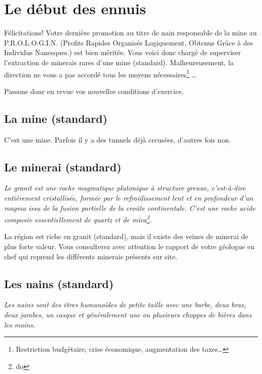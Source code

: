 
\newpage

\section{Le début des ennuis}

  Félicitations! Votre dernière promotion au titre de nain responsable de la
  mine au P.R.O.L.O.G.I.N. (Profits Rapides Organisés Logiquement, Obtenus Grâce à des Individus Nanesques.) est bien méritée. Vous voici donc chargé de superviser
  l'extraction de minerais rares d'une mine (standard). Malheureusement, la
  direction ne vous a pas accordé tous les moyens nécessaires\footnote{
  Restriction budgétaire, crise économique, augmentation des taxes\ldots{}}
  \ldots{}

  Passons donc en revue vos nouvelles conditions d'exercice.

\subsection{La mine (standard)}

C'est une mine. Parfois il y a des tunnels déjà creusées,  d'autres fois non.
  
\subsection{Le minerai (standard)}

  \textit{Le granit est une roche magmatique plutonique à structure grenue,
  c'est-à-dire entièrement cristallisée, formée par le refroidissement lent et
  en profondeur d'un magma issu de la fusion partielle de la croûte
  continentale.  C'est une roche acide composée essentiellement de quartz et de
  mica\footnote{do}.}

  La région est riche en granit (standard), mais il existe des veines de
  minerai de plus forte valeur. Vous consulterez avec attention le rapport de
  votre géologue en chef qui reprend les différents minerais présents sur site.

\subsection{Les nains (standard)}

  \textit{Les nains sont des êtres humanoïdes de petite taille avec une barbe,
  deux bras, deux jambes, un casque et généralement une ou plusieurs choppes de
  bières dans les mains.}

